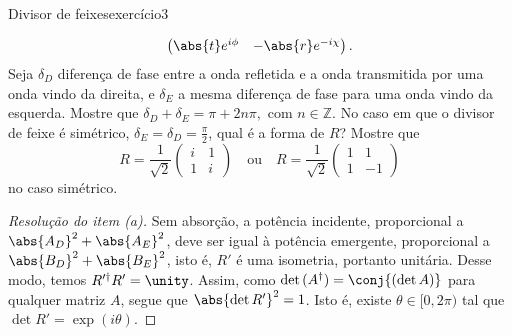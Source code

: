 \begin{exercício}{Divisor de feixes}{exercício3}
\begin{enumerate}[label=(\alph*)]
\begin{equation*}
\begin{pmatrix}
                    \abs{t}e^{i\phi} & -\abs{r} e^{-i\chi}\\
                \end{pmatrix}.
            \end{equation*}
            Seja \(\delta_D\) diferença de fase entre a onda refletida e a onda transmitida por uma onda vindo da direita, e \(\delta_E\) a mesma diferença de fase para uma onda vindo da esquerda. Mostre que \(\delta_D + \delta_E = \pi + 2n\pi,\) com \(n \in \mathbb{Z}\). No caso em que o divisor de feixe é simétrico, \(\delta_E = \delta_D = \frac\pi2\), qual é a forma de \(R\)? Mostre que
            \begin{equation*}
                R = \frac1{\sqrt{2}}\begin{pmatrix}
                    i & 1\\
                    1 & i
                \end{pmatrix}
                \quad\text{ou}\quad
                R = \frac1{\sqrt{2}}\begin{pmatrix}
                    1 & 1\\
                    1 & -1
                \end{pmatrix}
            \end{equation*}
            no caso simétrico.
    \end{enumerate}
\end{exercício}
\begin{proof}[Resolução do item (a)]
    Sem absorção, a potência incidente, proporcional a \(\abs{A_D}^2 + \abs{A_E}^2\), deve ser igual à potência emergente, proporcional a \(\abs{B_D}^2 + \abs{B_E}^2\), isto é, \(R'\) é uma isometria, portanto unitária. Desse modo, temos \(R'^\dag R' = \unity\). Assim, como \(\det{(A^\dag)} = \conj{(\det{A})}\) para qualquer matriz \(A\), segue que \(\abs{\det{R'}}^2 = 1\). Isto é, existe \(\theta \in [0, 2\pi)\) tal que \(\det{R'} = \exp(i\theta)\).
\end{proof}
